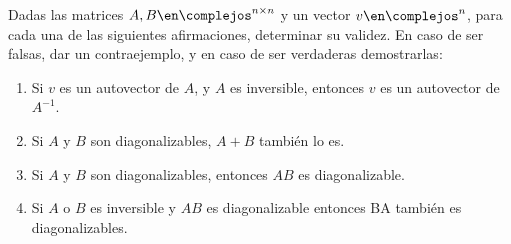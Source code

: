 \begin{enunciado}{\ejExtra}
	Dadas las matrices $A, B \en \complejos^{n \times n}$ y un vector $v \en \complejos^n$, para cada una de las siguientes afirmaciones, determinar
	su validez. En caso de ser falsas, dar un contraejemplo, y en caso de ser verdaderas demostrarlas:
	\begin{enumerate}[label=(\alph*)]
		\item Si $v$ es un autovector de $A$, y $A$ es inversible, entonces $v$ es un autovector de $A^{-1}$.

		\item Si $A$ y $B$ son diagonalizables, $A+B$ también lo es.

		\item Si $A$ y $B$ son diagonalizables, entonces $AB$ es diagonalizable.

		\item Si $A$ o $B$ es inversible y $AB$ es diagonalizable entonces BA también es diagonalizables.
	\end{enumerate}
\end{enunciado}


